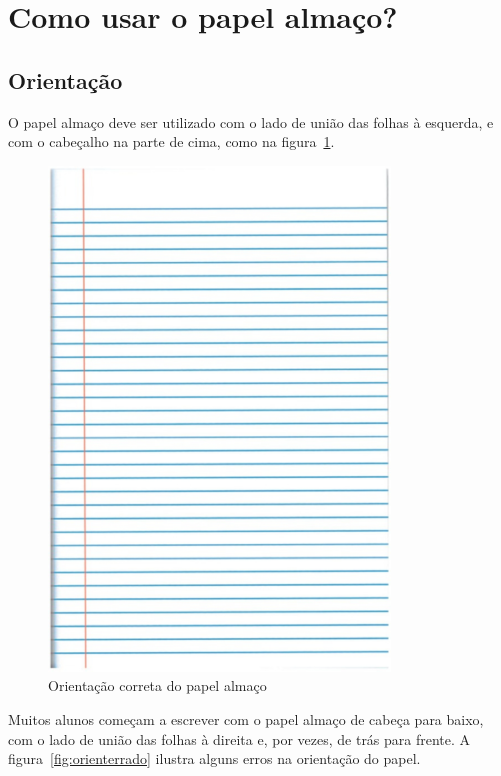 \section{Como usar o papel almaço?}
\label{sec:como}


\subsection{Orientação}
\label{sec:como-orientacao}

O papel almaço deve ser utilizado com o lado de união das folhas à esquerda, e
com o cabeçalho na parte de cima, como na figura~\ref{fig:orientacao}.

\begin{figure}[H]
\centering
\caption{Orientação correta do papel almaço}
\label{fig:orientacao}
\vspace{-0.3cm}
\includegraphics[scale=0.35]{imagens/almaco3.png}
\end{figure}

Muitos alunos começam a escrever com o papel almaço de cabeça para baixo, com o
lado de união das folhas à direita e, por vezes, de trás para frente. A
figura~\ref{fig:orienterrado} ilustra alguns erros na orientação do papel.


